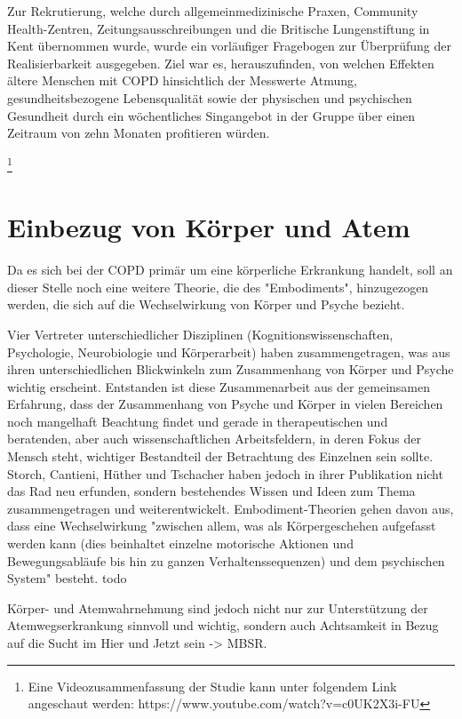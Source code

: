 Zur Rekrutierung, welche durch allgemeinmedizinische Praxen, Community Health-Zentren, Zeitungsausschreibungen und die Britische Lungenstiftung in Kent übernommen wurde, wurde ein vorläufiger Fragebogen zur Überprüfung der Realisierbarkeit ausgegeben. Ziel war es, herauszufinden, von welchen Effekten ältere Menschen mit COPD hinsichtlich der Messwerte Atmung, gesundheitsbezogene Lebensqualität sowie der physischen und psychischen Gesundheit durch ein wöchentliches Singangebot in der Gruppe über einen Zeitraum von zehn Monaten profitieren würden. 

\footnote{Eine Videozusammenfassung der Studie kann unter folgendem Link angeschaut werden: https://www.youtube.com/watch?v=c0UK2X3i-FU}

\section{Einbezug von Körper und Atem} 
\label{section:einbezug von koerper und atem}
Da es sich bei der COPD primär um eine körperliche Erkrankung handelt, soll an dieser Stelle noch eine weitere Theorie, die des "Embodiments", hinzugezogen werden, die sich auf die Wechselwirkung von Körper und Psyche bezieht. 

Vier Vertreter unterschiedlicher Disziplinen (Kognitionswissenschaften, Psychologie, Neurobiologie und Körperarbeit) haben zusammengetragen, was aus ihren unterschiedlichen Blickwinkeln zum Zusammenhang von Körper und Psyche wichtig erscheint. Entstanden ist diese Zusammenarbeit aus der gemeinsamen Erfahrung, dass der Zusammenhang von Psyche und Körper in vielen Bereichen noch mangelhaft Beachtung findet und gerade in therapeutischen und beratenden, aber auch wissenschaftlichen Arbeitsfeldern, in deren Fokus der Mensch steht, wichtiger Bestandteil der Betrachtung des Einzelnen sein sollte.
Storch, Cantieni, Hüther und Tschacher haben jedoch in ihrer Publikation nicht das Rad neu erfunden, sondern bestehendes Wissen und Ideen zum Thema zusammengetragen und weiterentwickelt. Embodiment-Theorien gehen davon aus, dass eine Wechselwirkung "zwischen allem, was als Körpergeschehen aufgefasst werden kann (dies beinhaltet einzelne motorische Aktionen und Bewegungsabläufe bis hin zu ganzen Verhaltenssequenzen) und dem psychischen System" \autocite[39]{hüther2010} besteht. todo

Körper- und Atemwahrnehmung sind jedoch nicht nur zur Unterstützung der Atemwegserkrankung sinnvoll und wichtig, sondern auch Achtsamkeit in Bezug auf die Sucht im Hier und Jetzt sein -> MBSR.

